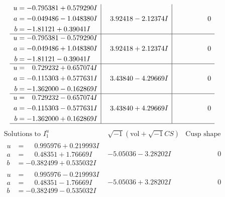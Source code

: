 \documentclass[1p]{elsarticle_modified}
\theoremstyle{definition}
\newcommand{\I}{\sqrt{-1}}
\begin{document}
$$\begin{array}{c|c|c}
\begin{aligned}
u &= -0.795381 + 0.579290 I \\
a &= -0.049486 - 1.048380 I \\
b &= -1.81121 + 0.39041 I\end{aligned}
 & \phantom{-}3.92418 - 2.12374 I & \phantom{-0.000000 } 0 \\ \hline\begin{aligned}
u &= -0.795381 - 0.579290 I \\
a &= -0.049486 + 1.048380 I \\
b &= -1.81121 - 0.39041 I\end{aligned}
 & \phantom{-}3.92418 + 2.12374 I & \phantom{-0.000000 } 0 \\ \hline\begin{aligned}
u &= \phantom{-}0.729232 + 0.657074 I \\
a &= -0.115303 + 0.577631 I \\
b &= -1.362000 - 0.162869 I\end{aligned}
 & \phantom{-}3.43840 - 4.29669 I & \phantom{-0.000000 } 0 \\ \hline\begin{aligned}
u &= \phantom{-}0.729232 - 0.657074 I \\
a &= -0.115303 - 0.577631 I \\
b &= -1.362000 + 0.162869 I\end{aligned}
 & \phantom{-}3.43840 + 4.29669 I & \phantom{-0.000000 } 0\\
 \hline 
 \end{array}$$\newpage$$\begin{array}{c|c|c}  
\text{Solutions to }I^u_{1}& \I (\text{vol} + \sqrt{-1}CS) & \text{Cusp shape}\\
 \hline 
\begin{aligned}
u &= \phantom{-}0.995976 + 0.219993 I \\
a &= \phantom{-}0.48351 + 1.76669 I \\
b &= -0.382499 + 0.535032 I\end{aligned}
 & -5.05036 - 3.28202 I & \phantom{-0.000000 } 0 \\ \hline\begin{aligned}
u &= \phantom{-}0.995976 - 0.219993 I \\
a &= \phantom{-}0.48351 - 1.76669 I \\
b &= -0.382499 - 0.535032 I\end{aligned}
 & -5.05036 + 3.28202 I & \phantom{-0.000000 } 0 \\ \hline\begin{aligned}

\end{aligned}
\end{array}$$
\end{document}
